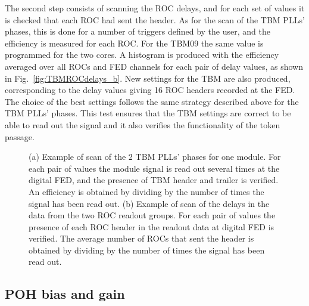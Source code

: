 The second step consists of scanning the ROC delays, and for each set of values it is checked that each ROC had sent the header.
As for the scan of the TBM PLLs' phases, this is done for a number of triggers defined by the user, and the efficiency is measured for each ROC.
For the TBM09 the same value is programmed for the two cores.
A histogram is produced with the efficiency averaged over all ROCs and FED channels for each pair of delay values, as shown in Fig.~\ref{fig:TBMROCdelays_b}.
New settings for the TBM are also produced, corresponding to the delay values giving 16 ROC headers recorded at the FED.
The choice of the best settings follows the same strategy described above for the TBM PLLs' phases.
This test ensures that the TBM settings are correct to be able to read out the signal and it also verifies the functionality of the token passage.

\begin{figure}[!htb]
 \begin{center}
 \end{center}
 \caption{(a) Example of scan of the 2 TBM PLLs' phases for one module. For each pair of values the module signal is read out several times at the digital FED, and the presence of TBM header and trailer is verified.
 An efficiency is obtained by dividing by the number of times the signal has been read out.
 (b) Example of scan of the delays in the  data from the two ROC readout groups. For each pair of values the presence of each ROC header in the readout data at digital FED is verified. The average number of ROCs that sent the header is obtained by dividing by the number of times the signal has been read out.}
 \label{fig:TBMROCdelays}
\end{figure} 

\subsection{POH bias and gain}

